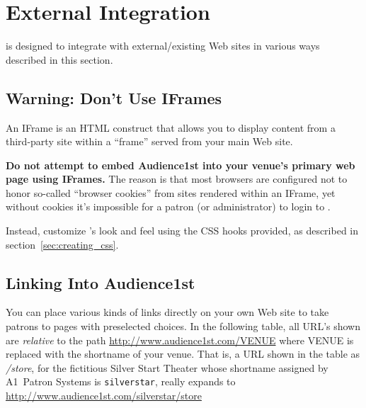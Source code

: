 \section{External Integration}

\af is designed to integrate with external/existing Web sites in various
ways described in this section.

\subsection{Warning: Don't Use IFrames}
\label{sec:iframes}

An IFrame is an HTML construct that allows you to display content from a
third-party site within a ``frame'' served from your main Web site.

\textbf{Do not attempt to embed Audience1st into your venue's primary
  web page using IFrames.}  The reason is that most browsers are
configured not to honor so-called ``browser cookies'' from sites
rendered within an IFrame, yet without cookies it's impossible for a
patron (or administrator) to login to \af.

Instead, customize \af's look and feel using the CSS hooks provided, as
described in section~\ref{sec:creating_css}.

\subsection{Linking Into Audience1st}
\label{sec:linking}

You can place various kinds of links directly on your own Web site to
take patrons to \af pages with preselected choices.  In the following
table, all URL's shown are \emph{relative} to the path
\url{http://www.audience1st.com/VENUE} where VENUE is replaced with the
shortname of your venue.  That is, a URL shown in the table as
\emph{/store}, for the fictitious Silver Start Theater  whose shortname
assigned by A1~Patron Systems is \verb+silverstar+, really expands to
\url{http://www.audience1st.com/silverstar/store} 

